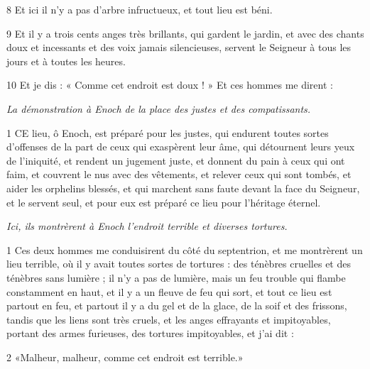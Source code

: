 \par 8 Et ici il n'y a pas d'arbre infructueux, et tout lieu est béni.

\par 9 Et il y a trois cents anges très brillants, qui gardent le jardin, et avec des chants doux et incessants et des voix jamais silencieuses, servent le Seigneur à tous les jours et à toutes les heures.

\par 10 Et je dis : « Comme cet endroit est doux ! » Et ces hommes me dirent :


\par \textit{La démonstration à Enoch de la place des justes et des compatissants.}

\par 1 CE lieu, ô Enoch, est préparé pour les justes, qui endurent toutes sortes d'offenses de la part de ceux qui exaspèrent leur âme, qui détournent leurs yeux de l'iniquité, et rendent un jugement juste, et donnent du pain à ceux qui ont faim, et couvrent le nus avec des vêtements, et relever ceux qui sont tombés, et aider les orphelins blessés, et qui marchent sans faute devant la face du Seigneur, et le servent seul, et pour eux est préparé ce lieu pour l'héritage éternel.


\par \textit{Ici, ils montrèrent à Enoch l'endroit terrible et diverses tortures.}

\par 1 Ces deux hommes me conduisirent du côté du septentrion, et me montrèrent un lieu terrible, où il y avait toutes sortes de tortures : des ténèbres cruelles et des ténèbres sans lumière ; il n'y a pas de lumière, mais un feu trouble qui flambe constamment en haut, et il y a un fleuve de feu qui sort, et tout ce lieu est partout en feu, et partout il y a du gel et de la glace, de la soif et des frissons, tandis que les liens sont très cruels, et les anges effrayants et impitoyables, portant des armes furieuses, des tortures impitoyables, et j'ai dit :

\par 2 «Malheur, malheur, comme cet endroit est terrible.»

